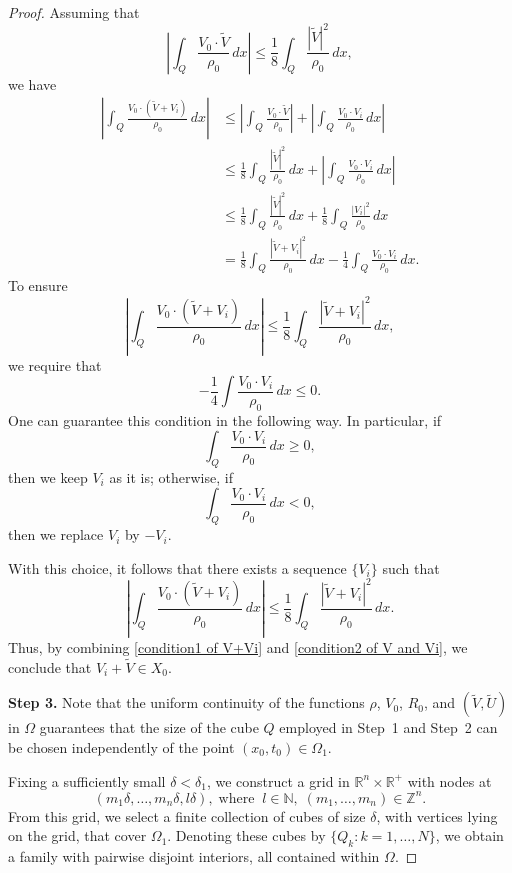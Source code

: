 \documentclass[12pt,reqno]{amsart}
\theoremstyle{definition}
\theoremstyle{remark}
\numberwithin{equation}{section}
\begin{document}
\begin{proof}
Assuming that
\[
\left| \int_Q \frac{V_0 \cdot \widetilde{V}}{\rho_0} \, dx \right| \leq \frac{1}{8} \int_Q \frac{|\widetilde{V}|^2}{\rho_0} \, dx,
\]
we have
\begin{align*}
\left| \int_Q \frac{V_0 \cdot (\widetilde{V} + V_i)}{\rho_0}\,dx \right| & \leq \left| \int_Q\frac{V_0 \cdot \widetilde{V}}{\rho_0} \right| + \left| \int_Q \frac{V_0 \cdot V_i}{\rho_0} \,dx\right| \\
& \leq \frac{1}{8} \int_Q \frac{|\widetilde{V}|^2}{\rho_0}\,dx + \left| \int_Q \frac{V_0 \cdot V_i}{\rho_0} \,dx\right| \\
& \leq \frac{1}{8} \int_Q \frac{|\widetilde{V}|^2}{\rho_0} \,dx+ \frac{1}{8} \int_Q \frac{|V_i|^2}{\rho_0}\,dx \\
& = \frac{1}{8} \int_Q \frac{|\widetilde{V} + V_i|^2}{\rho_0}\,dx - \frac{1}{4} \int_Q \frac{V_0 \cdot V_i}{\rho_0}\,dx.
\end{align*}
To ensure 
\[ \left| \int_Q \frac{V_0 \cdot (\widetilde{V} + V_i)}{\rho_0} \,dx\right|
\leq \frac{1}{8} \int_Q \frac{|\widetilde{V} + V_i|^2}{\rho_0}\,dx,
\]
we require that
\[
- \frac{1}{4} \int \frac{V_0 \cdot V_i}{\rho_0} \,dx\leq 0.
\]
One can guarantee this condition in the following way. In particular, 
if 
$$
\int_Q \frac{V_0 \cdot V_i}{\rho_0}\,dx \geq 0,
$$ 
then we keep $ V_i $ as it is;  otherwise, if  
$$ 
\int_Q \frac{V_0 \cdot V_i}{\rho_0} \,dx< 0,
$$ 
then we replace $ V_i $ by $ -V_i $. 

With this choice, it follows that there exists a sequence $\{V_i\}$ such that 
\begin{equation}
\label{condition2 of V and Vi}
\left| \int_Q \frac{V_0 \cdot (\widetilde{V} + V_i)}{\rho_0}\,dx \right| \leq \frac{1}{8} \int_Q \frac{|\widetilde{V} + V_i|^2}{\rho_0}\,dx.
\end{equation}
Thus,  by combining  \eqref{condition1 of V+Vi} and \eqref{condition2 of V and Vi}, we conclude that 
$V_i + \widetilde{V} \in X_0$.  

\textbf{Step 3.}
Note that the uniform continuity of the functions $\rho$, $V_0$, $R_0$, and $(\widetilde{V}, \widetilde{U})$ in $\Omega$ guarantees that the size of the cube $Q$ employed in Step~1 and Step~2 can be chosen independently of the point $(x_0, t_0) \in \Omega_1$. 

Fixing a sufficiently small $\delta < \delta_1$, we construct a grid in $\mathbb{R}^n \times \mathbb{R}^+$ with nodes at
\[
(m_1 \delta, \dots, m_n \delta, l \delta), \;\text{where}\;\; l \in \mathbb{N}, \; (m_1, \dots, m_n) \in \mathbb{Z}^n .
\]
From this grid, we select a finite collection of cubes of size $\delta$, with vertices lying on the grid, that cover $\Omega_1$. Denoting these cubes by $\{Q_k : k = 1, \dots, N\}$, we obtain a family with pairwise disjoint interiors, all contained within $\Omega$.


\end{proof}
\end{document}
